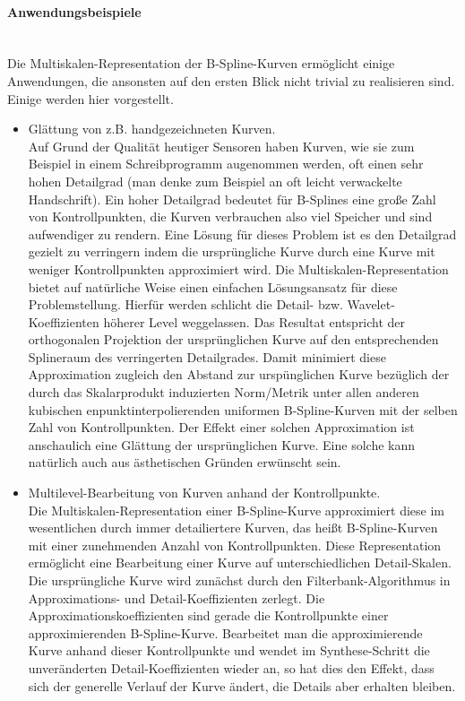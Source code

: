 \paragraph{Anwendungsbeispiele}~\\
Die Multiskalen-Representation der B-Spline-Kurven ermöglicht einige Anwendungen, die ansonsten auf den ersten Blick nicht trivial zu realisieren sind. Einige werden hier vorgestellt.
\begin{itemize}
\item Glättung von z.B. handgezeichneten Kurven.\\
Auf Grund der Qualität heutiger Sensoren haben Kurven, wie sie zum Beispiel in einem Schreibprogramm augenommen werden, oft einen sehr hohen Detailgrad (man denke zum Beispiel an oft leicht verwackelte Handschrift). Ein hoher Detailgrad bedeutet für B-Splines eine große Zahl von Kontrollpunkten, die Kurven verbrauchen also viel Speicher und sind aufwendiger zu rendern. Eine Lösung für dieses Problem ist es den Detailgrad gezielt zu verringern indem die ursprüngliche Kurve durch eine Kurve mit weniger Kontrollpunkten approximiert wird. Die Multiskalen-Representation bietet auf natürliche Weise einen einfachen Lösungsansatz für diese Problemstellung. Hierfür werden schlicht die Detail- bzw. Wavelet-Koeffizienten höherer Level weggelassen. Das Resultat entspricht der orthogonalen Projektion der ursprünglichen Kurve auf den entsprechenden Splineraum des verringerten Detailgrades. Damit minimiert diese Approximation zugleich den Abstand zur urspünglichen Kurve bezüglich der durch das Skalarprodukt induzierten Norm/Metrik unter allen anderen kubischen enpunktinterpolierenden uniformen B-Spline-Kurven mit der selben Zahl von Kontrollpunkten.
Der Effekt einer solchen Approximation ist anschaulich eine Glättung der ursprünglichen Kurve. Eine solche kann natürlich auch aus ästhetischen Gründen erwünscht sein.
%
\item Multilevel-Bearbeitung von Kurven anhand der Kontrollpunkte.\\
Die Multiskalen-Representation einer B-Spline-Kurve approximiert diese im wesentlichen durch immer detailiertere Kurven, das heißt B-Spline-Kurven mit einer zunehmenden Anzahl von Kontrollpunkten. Diese Representation ermöglicht eine Bearbeitung einer Kurve auf unterschiedlichen Detail-Skalen. Die ursprüngliche Kurve wird zunächst durch den Filterbank-Algorithmus in Approximations- und Detail-Koeffizienten zerlegt. Die Approximationskoeffizienten sind gerade die Kontrollpunkte einer approximierenden B-Spline-Kurve. Bearbeitet man die approximierende Kurve anhand dieser Kontrollpunkte und wendet im Synthese-Schritt die unveränderten Detail-Koeffizienten wieder an, so hat dies den Effekt, dass sich der generelle Verlauf der Kurve ändert, die Details aber erhalten bleiben. 
\end{itemize}
%